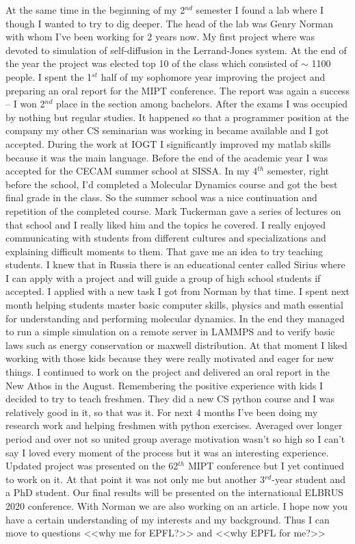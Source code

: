 \documentclass[11pt, a4paper]{awesome-cv}
\begin{document}
\begin{cvletter}
At the same time in the beginning of my 2$^{nd}$ semester I found a lab where I though I wanted to try to dig deeper. The head of the lab was Genry Norman with whom I've been working for 2 years now. My first project where was devoted to simulation of self-diffusion in the Lerrand-Jones system. At the end of the year the project was elected top 10 of the class which consisted of $\sim$ 1100 people. I spent the 1$^{st}$ half of my sophomore year improving the project and preparing an oral report for the MIPT conference. The report was again a success -- I won 2$^{nd}$ place in the section among bachelors. After the exams I was occupied by nothing but regular studies. It happened so that a programmer position at the company my other CS seminarian was working in became available and I got accepted. During the work at IOGT I significantly improved my matlab skills because it was the main language. Before the end of the academic year I was accepted for the CECAM summer school at SISSA. In my 4$^{th}$ semester, right before the school, I'd completed a Molecular Dynamics course and got the best final grade in the class. So the summer school was a nice continuation and repetition of the completed course. Mark Tuckerman gave a series of lectures on that school and I really liked him and the topics he covered. I really enjoyed communicating with students from different cultures and specializations and explaining difficult moments to them. That gave me an idea to try teaching students. I knew that in Russia there is an educational center called Sirius where I can apply with a project and will guide a group of high school students if accepted. I applied with a new task I got from Norman by that time. I spent next month helping students master basic computer skills, physics and math essential for understanding and performing molecular dynamics. In the end they managed to run a simple simulation on  a remote server in LAMMPS and to verify basic laws such as energy conservation or maxwell distribution. At that moment I liked working with those kids because they were really motivated and eager for new things. I continued to work on the project and delivered an oral report in the New Athos in the August. Remembering the positive experience with kids I decided to try to teach freshmen. They did a new CS python course and I was relatively good in it, so that was it. For next 4 months I've been doing my research work and helping freshmen with python exercises. Averaged over longer period and over not so united group average motivation wasn't so high so I can't say I loved every moment of the process but it was an interesting experience. Updated project was presented on the 62$^{th}$ MIPT conference but I yet continued to work on it. At that point it was not only me but another 3$^{rd}$-year student and a PhD student. Our final results will be presented on the international ELBRUS 2020 conference. With Norman we are also working on an article. I hope now you have a certain understanding of my interests and my background. Thus I can move to questions <<why me for EPFL?>> and <<why EPFL for me?>>


\end{cvletter}
\end{document}
